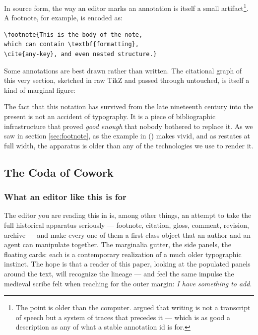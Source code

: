 \documentclass{article}
\providecommand{\vfid}[1]{}
\providecommand{\vcid}[1]{}
\begin{document}
In source form, the way an editor marks an annotation is itself a small artifact\vfid{f007}\footnote{The point is older than the computer. \vcid{cc16}\citet{derrida1967} argued that writing is not a transcript of speech but a system of traces that precedes it --- which is as good a description as any of what a stable annotation id is for.}. A footnote, for example, is encoded as: %

\begin{verbatim}
\footnote{This is the body of the note,
which can contain \textbf{formatting},
\cite{any-key}, and even nested structure.}
\end{verbatim} %

Some annotations are best drawn rather than written. The citational graph of this very section, sketched in raw TikZ and passed through untouched, is itself a kind of marginal figure: %


The fact that this notation has survived from the late nineteenth century into the present is not an accident of typography. It is a piece of bibliographic infrastructure that proved \emph{good enough} that nobody bothered to replace it. As we saw in section \ref{sec:footnote}, as the example in () makes vivid, and as  restates at full width, the apparatus is older than any of the technologies we use to render it. %

\subsection{The Coda of Cowork}
\label{sec:cowork} %

\subsubsection{What an editor like this is for}
\label{sec:purpose} %

The editor you are reading this in is, among other things, an attempt to take the full historical apparatus seriously --- footnote, citation, gloss, comment, revision, archive --- and make every one of them a first-class object that an author and an agent can manipulate together. The marginalia gutter, the side panels, the floating cards: each is a contemporary realization of a much older typographic instinct. The hope is that a reader of this paper, looking at the populated panels around the text, will recognize the lineage --- and feel the same impulse the medieval scribe felt when reaching for the outer margin: \emph{I have something to add}. %

\end{document}
